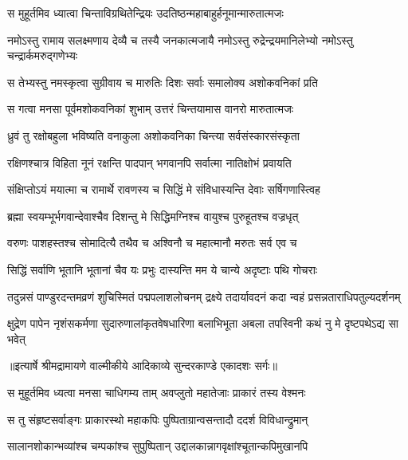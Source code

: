 \twolineshloka
{स मुहूर्तमिव ध्यात्वा चिन्ताविग्रथितेन्द्रियः}
{उदतिष्ठन्महाबाहुर्हनूमान्मारुतात्मजः} %

\fourlineindentedshloka
{नमोऽस्तु रामाय सलक्ष्मणाय}
{ देव्यै च तस्यै जनकात्मजायै}
{नमोऽस्तु रुद्रेन्द्रयमानिलेभ्यो}
{ नमोऽस्तु चन्द्रार्कमरुद्गणेभ्यः} %

\twolineshloka
{स तेभ्यस्तु नमस्कृत्वा सुग्रीवाय च मारुतिः}
{दिशः सर्वाः समालोक्य अशोकवनिकां प्रति} %

\twolineshloka
{स गत्वा मनसा पूर्वमशोकवनिकां शुभाम्}
{उत्तरं चिन्तयामास वानरो मारुतात्मजः} %

\twolineshloka
{ध्रुवं तु रक्षोबहुला भविष्यति वनाकुला}
{अशोकवनिका चिन्त्या सर्वसंस्कारसंस्कृता} %

\twolineshloka
{रक्षिणश्चात्र विहिता नूनं रक्षन्ति पादपान्}
{भगवानपि सर्वात्मा नातिक्षोभं प्रवायति} %

\twolineshloka
{संक्षिप्तोऽयं मयात्मा च रामार्थे रावणस्य च}
{सिद्धिं मे संविधास्यन्ति देवाः सर्षिगणास्त्विह} %

\twolineshloka
{ब्रह्मा स्वयम्भूर्भगवान्देवाश्चैव दिशन्तु मे}
{सिद्धिमग्निश्च वायुश्च पुरुहूतश्च वज्रधृत्} %

\twolineshloka
{वरुणः पाशहस्तश्च सोमादित्यै तथैव च}
{अश्विनौ च महात्मानौ मरुतः सर्व एव च} %

\twolineshloka
{सिद्धिं सर्वाणि भूतानि भूतानां चैव यः प्रभुः}
{दास्यन्ति मम ये चान्ये अदृष्टाः पथि गोचराः} %

\fourlineindentedshloka
{तदुन्नसं पाण्डुरदन्तमव्रणं}
{ शुचिस्मितं पद्मपलाशलोचनम्}
{द्रक्ष्ये तदार्यावदनं कदा न्वहं}
{ प्रसन्नताराधिपतुल्यदर्शनम्} %

\fourlineindentedshloka
{क्षुद्रेण पापेन नृशंसकर्मणा}
{ सुदारुणालांकृतवेषधारिणा}
{बलाभिभूता अबला तपस्विनी}
{ कथं नु मे दृष्टपथेऽद्य सा भवेत्} %


{॥इत्यार्षे श्रीमद्रामायणे वाल्मीकीये आदिकाव्ये सुन्दरकाण्डे एकादशः सर्गः॥}


\twolineshloka
{स मुहूर्तमिव ध्यत्वा मनसा चाधिगम्य ताम्}
{अवप्लुतो महातेजाः प्राकारं तस्य वेश्मनः} %

\twolineshloka
{स तु संहृष्टसर्वाङ्गः प्राकारस्थो महाकपिः}
{पुष्पिताग्रान्वसन्तादौ ददर्श विविधान्द्रुमान्} %

\twolineshloka
{सालानशोकान्भव्यांश्च चम्पकांश्च सुपुष्पितान्}
{उद्दालकान्नागवृक्षांश्चूतान्कपिमुखानपि} %

